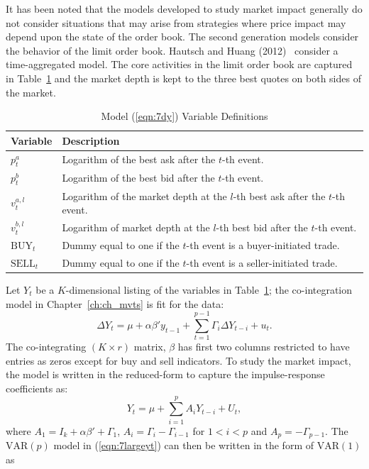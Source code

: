 It has been noted that the models developed to study market impact generally do not consider situations that may arise from strategies where price impact may depend upon the state of the order book. The second generation models consider the behavior of the limit order book. Hautsch and Huang (2012)~\cite{hauthuang} consider a time-aggregated model. The core activities in the limit order book are captured in Table~\ref{tab:vardef} and the market depth is kept to the three best quotes on both sides of the market.
	\begin{table}[!ht]
	\centering
	\caption{Model (\ref{eqn:7dy}) Variable Definitions \label{tab:vardef}}
	\begin{tabular}{ll}
	Variable & Description \\ \hline
	$p_t^a$ & Logarithm of the best ask after the $t$-th event. \\
	$p_t^b$ & Logarithm of the best bid after the $t$-th event. \\
	$v_t^{a,l}$ & Logarithm of the market depth at the $l$-th best ask after the $t$-th event. \\
	$v_t^{b,l}$ & Logarithm of market depth at the $l$-th best bid after the $t$-th event. \\
	$\text{BUY}_t$ & Dummy equal to one if the $t$-th event is a buyer-initiated trade. \\
	$\text{SELL}_t$ & Dummy equal to one if the $t$-th event is a seller-initiated trade. 
	\end{tabular} 
	\end{table}
Let $Y_t$ be a $K$-dimensional listing of the variables in Table~\ref{tab:vardef}; the co-integration model in Chapter~\ref{ch:ch_mvts} is fit for the data:
	\begin{equation} \label{eqn:7dy}
	\Delta Y_t = \mu + \alpha \beta' y_{t-1} + \sum_{t=1}^{p-1} \Gamma_i \Delta Y_{t-i} + u_t.
	\end{equation}
The co-integrating $(K \times r)$ matrix, $\beta$ has first two columns restricted to have entries as zeros except for buy and sell indicators. To study the market impact, the model is written in the reduced-form to capture the impulse-response coefficients as:
	\begin{equation}\label{eqn:7largeyt}
	Y_t = \mu + \sum_{i=1}^p A_i Y_{t-i} + U_t,
	\end{equation}
where $A_1=I_k+\alpha\beta' + \Gamma_1$, $A_i=\Gamma_i - \Gamma_{i-1}$ for $1<i<p$ and $A_p= -\Gamma_{p-1}$. The $\text{VAR}(p)$ model in (\ref{eqn:7largeyt}) can then be written in the form of $\text{VAR}(1)$ as 
